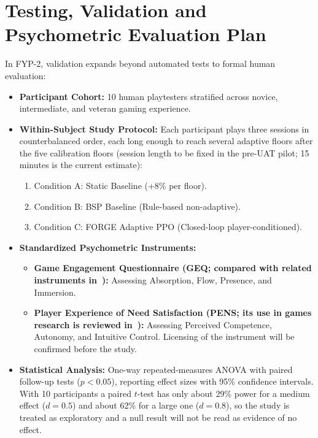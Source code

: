 \section{Testing, Validation and Psychometric Evaluation Plan}
In FYP-2, validation expands beyond automated tests to formal human evaluation:
\begin{itemize}
    \item \textbf{Participant Cohort:} 10 human playtesters stratified across novice, intermediate, and veteran gaming experience.
    \item \textbf{Within-Subject Study Protocol:} Each participant plays three sessions in counterbalanced order, each long enough to reach several adaptive floors after the five calibration floors (session length to be fixed in the pre-UAT pilot; 15 minutes is the current estimate):
    \begin{enumerate}
        \item Condition A: Static Baseline (+8\% per floor).
        \item Condition B: BSP Baseline (Rule-based non-adaptive).
        \item Condition C: FORGE Adaptive PPO (Closed-loop player-conditioned).
    \end{enumerate}
    \item \textbf{Standardized Psychometric Instruments:}
    \begin{itemize}
        \item \textbf{Game Engagement Questionnaire (GEQ; compared with related instruments in~\cite{denisova2016convergence}):} Assessing Absorption, Flow, Presence, and Immersion.
        \item \textbf{Player Experience of Need Satisfaction (PENS; its use in games research is reviewed in~\cite{tyack2020sdt}):} Assessing Perceived Competence, Autonomy, and Intuitive Control. Licensing of the instrument will be confirmed before the study.
    \end{itemize}
    \item \textbf{Statistical Analysis:} One-way repeated-measures ANOVA with paired follow-up tests ($p < 0.05$), reporting effect sizes with 95\% confidence intervals. With 10 participants a paired $t$-test has only about 29\% power for a medium effect ($d = 0.5$) and about 62\% for a large one ($d = 0.8$), so the study is treated as exploratory and a null result will not be read as evidence of no effect.
\end{itemize}

